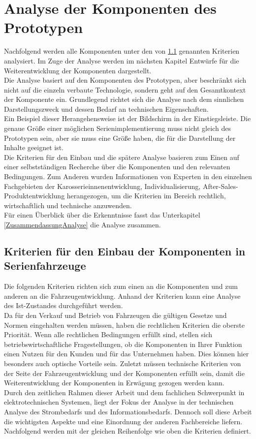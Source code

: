 \chapter{Analyse der Komponenten des Prototypen}
\label{cha:Analyse}
Nachfolgend werden alle Komponenten unter den von \ref{cha:Kriterien} genannten Kriterien analysiert. Im Zuge der Analyse werden im nächsten Kapitel Entwürfe für die Weiterentwicklung der Komponenten dargestellt.\\
Die Analyse basiert auf den Komponenten des Prototypen, aber beschränkt sich nicht auf die einzeln verbaute Technologie, sondern geht auf den Gesamtkontext der Komponente ein. Grundlegend richtet sich die Analyse nach dem sinnlichen Darstellungszweck und dessen Bedarf an technischen Eigenschaften. \\
Ein Beispiel dieser Herangehensweise ist der Bildschirm in der Einstiegsleiste. Die genaue Größe einer möglichen Serienimplementierung muss nicht gleich des Prototypen sein, aber sie muss eine Größe haben, die für die Darstellung der Inhalte geeignet ist.\\
Die Kriterien für den Einbau und die spätere Analyse basieren zum Einen auf einer selbstständigen Recherche über die Komponenten und den relevanten Bedingungen. Zum Anderen wurden Informationen von Experten in den einzelnen Fachgebieten der Karosserieinnenentwicklung, Individualisierung, After-Sales-Produktentwicklung herangezogen, um die Kriterien im Bereich rechtlich, wirtschaftlich und technische anzuwenden. \\
Für einen Überblick über die Erkenntnisse fasst das Unterkapitel \ref{ZusammendassungAnalyse} die Analyse zusammen.
\section{Kriterien für den Einbau der Komponenten in Serienfahrzeuge}
\label{cha:Kriterien}
Die folgenden Kriterien richten sich zum einen an die Komponenten und zum anderen an die Fahrzeugentwicklung. Anhand der Kriterien kann eine Analyse des Ist-Zustandes durchgeführt werden.\\
Da für den Verkauf und Betrieb von Fahrzeugen die gültigen Gesetze und Normen eingehalten werden müssen, haben die rechtlichen Kriterien die oberste Priorität. Wenn alle rechtlichen Bedingungen erfüllt sind, stellen sich betriebswirtschaftliche Fragestellungen, ob die Komponenten in Ihrer Funktion einen Nutzen für den Kunden und für das Unternehmen haben. Dies können hier besonders auch optische Vorteile sein. Zuletzt müssen technische Kriterien von der Seite der Fahrzeugentwicklung und der Komponenten erfüllt sein, damit die Weiterentwicklung der Komponenten in Erwägung gezogen werden kann. \\
Durch den zeitlichen Rahmen dieser Arbeit und dem fachlichen Schwerpunkt in elektrotechnischen Systemen, liegt der Fokus der Analyse in der technischen Analyse des Strombedarfs und des Informationsbedarfs. Dennoch soll diese Arbeit die wichtigsten Aspekte und eine Einordnung der anderen Fachbereiche liefern.\\
Nachfolgend werden mit der gleichen Reihenfolge wie oben die Kriterien definiert.
